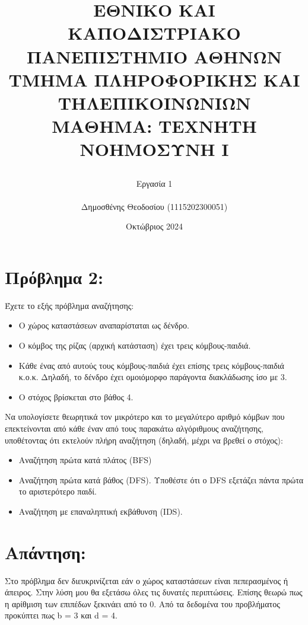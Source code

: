 \documentclass{article}
\title{\bfseries\small
\begin{flushleft}
ΕΘΝΙΚΟ ΚΑΙ ΚΑΠΟΔΙΣΤΡΙΑΚΟ ΠΑΝΕΠΙΣΤΗΜΙΟ ΑΘΗΝΩΝ\\
ΤΜΗΜΑ ΠΛΗΡΟΦΟΡΙΚΗΣ ΚΑΙ ΤΗΛΕΠΙΚΟΙΝΩΝΙΩΝ\\
ΜΑΘΗΜΑ: ΤΕΧΝΗΤΗ ΝΟΗΜΟΣΥΝΗ I\\
\end{flushleft}
}
\author{\Large Εργασία 1 \\ \\Δημοσθένης Θεοδοσίου (1115202300051)}
\date{Οκτώβριος 2024}
\begin{document}
\maketitle
\section*{Πρόβλημα 2:}
Έχετε το εξής πρόβλημα αναζήτησης:
\begin{itemize}
    \item Ο χώρος καταστάσεων αναπαρίσταται ως δένδρο.
    \item Ο κόμβος της ρίζας (αρχική κατάσταση) έχει τρεις κόμβους-παιδιά.
    \item Κάθε ένας από αυτούς τους κόμβους-παιδιά έχει επίσης τρεις κόμβους-παιδιά κ.ο.κ. Δηλαδή, το δένδρο έχει ομοιόμορφο παράγοντα διακλάδωσης ίσο με 3.
    \item Ο στόχος βρίσκεται στο βάθος 4.
\end{itemize}

Να υπολογίσετε θεωρητικά τον μικρότερο και το μεγαλύτερο αριθμό κόμβων που επεκτείνονται από κάθε έναν από τους παρακάτω αλγόριθμους αναζήτησης, υποθέτοντας ότι εκτελούν πλήρη αναζήτηση (δηλαδή, μέχρι να βρεθεί ο στόχος):
\begin{itemize}
    \item Αναζήτηση πρώτα κατά πλάτος (\textlatin{BFS})
    \item Αναζήτηση πρώτα κατά βάθος (\textlatin{DFS}). Υποθέστε ότι ο \textlatin{DFS} εξετάζει πάντα πρώτα το αριστερότερο παιδί.
    \item Αναζήτηση με επαναληπτική εκβάθυνση (\textlatin{IDS}).
\end{itemize}


\section*{Απάντηση:}
Στο πρόβλημα δεν διευκρινίζεται εάν ο χώρος καταστάσεων είναι πεπερασμένος ή άπειρος. Στην λύση μου θα εξετάσω όλες τις δυνατές περιπτώσεις. Επίσης θεωρώ πως η αρίθμιση των επιπέδων ξεκινάει από το 0.
Από τα δεδομένα του προβλήματος προκύπτει πως \textlatin{b} = 3 και \textlatin{d} = 4. 
\end{document}
